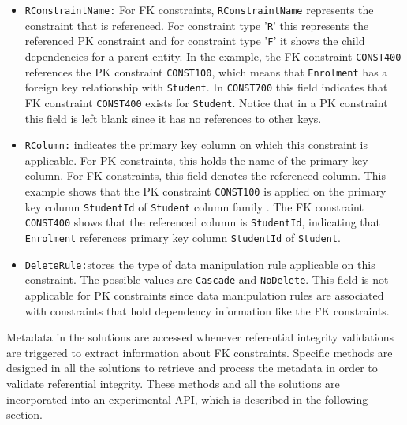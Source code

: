 \begin{itemize}
  \item \texttt{RConstraintName:} For \ac{FK}
  constraints, \texttt{RConstraintName} represents the constraint that is
  referenced. For constraint type '\texttt{R}' this represents the referenced
  \ac{PK} constraint and for constraint type '\texttt{F}' it shows  the child
  dependencies for a parent entity. In the example, the \ac{FK} constraint
  \texttt{CONST400} references the \ac{PK} constraint \texttt{CONST100},  which
  means that \texttt{Enrolment} has a foreign key relationship with
  \texttt{Student}.
   In \texttt{CONST700} this field indicates that \ac{FK} constraint
   \texttt{CONST400} exists for \texttt{Student}. Notice that in a \ac{PK}
   constraint this field is left blank since it has no references to other keys.
  
  \item \texttt{RColumn:}  indicates the primary key column on which this
  constraint is applicable.  For \ac{PK} constraints,  this holds the name of
  the primary key column. For \ac{FK} constraints, this field denotes
  the referenced column.  This example shows that the \ac{PK} constraint
  \texttt{CONST100} is applied on the primary key column \texttt{StudentId} of
  \texttt{Student} column family . The \ac{FK} constraint \texttt{CONST400}
  shows that the referenced column is \texttt{StudentId},  indicating that
  \texttt{Enrolment} references  primary key column \texttt{StudentId} of
  \texttt{Student}.
  
  \item \texttt{DeleteRule:}stores the type of data manipulation rule applicable
  on this constraint. The possible values are  \texttt{Cascade} and
  \texttt{NoDelete}.  This field is not applicable  for \ac{PK} constraints
   since data manipulation rules are associated with constraints that hold
  dependency information like the \ac{FK} constraints.
  
\end{itemize}

Metadata in the solutions are accessed whenever referential integrity
validations are triggered to extract information about \ac{FK} constraints. 
Specific methods are designed in all the solutions to retrieve and process the
metadata in order to validate referential integrity.  These methods and all the
solutions are incorporated  into an experimental \ac{API}, which is
described in the following section.

 

	
